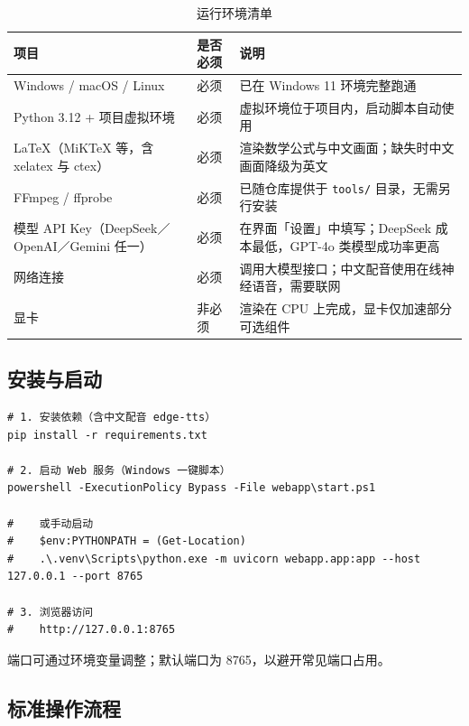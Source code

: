 \documentclass[11pt,a4paper]{ctexart}
\begin{document}
\begin{table}[htbp]
\centering
\small
\caption{运行环境清单}
\begin{tabularx}{\textwidth}{@{}p{3.4cm} p{2.6cm} X@{}}
\toprule
\textbf{项目} & \textbf{是否必须} & \textbf{说明} \\
\midrule
Windows / macOS / Linux & 必须 & 已在 Windows 11 环境完整跑通 \\
Python 3.12 + 项目虚拟环境 & 必须 & 虚拟环境位于项目内，启动脚本自动使用 \\
LaTeX（MiKTeX 等，含 xelatex 与 ctex） & 必须 & 渲染数学公式与中文画面；缺失时中文画面降级为英文 \\
FFmpeg / ffprobe & 必须 & 已随仓库提供于 \texttt{tools/} 目录，无需另行安装 \\
模型 API Key（DeepSeek／OpenAI／Gemini 任一） & 必须 & 在界面「设置」中填写；DeepSeek 成本最低，GPT-4o 类模型成功率更高 \\
网络连接 & 必须 & 调用大模型接口；中文配音使用在线神经语音，需要联网 \\
显卡 & 非必须 & 渲染在 CPU 上完成，显卡仅加速部分可选组件 \\
\bottomrule
\end{tabularx}
\end{table}

\subsection{安装与启动}

\begin{lstlisting}
# 1. 安装依赖（含中文配音 edge-tts）
pip install -r requirements.txt

# 2. 启动 Web 服务（Windows 一键脚本）
powershell -ExecutionPolicy Bypass -File webapp\start.ps1

#    或手动启动
#    $env:PYTHONPATH = (Get-Location)
#    .\.venv\Scripts\python.exe -m uvicorn webapp.app:app --host 127.0.0.1 --port 8765

# 3. 浏览器访问
#    http://127.0.0.1:8765
\end{lstlisting}

端口可通过环境变量调整；默认端口为 8765，以避开常见端口占用。

\subsection{标准操作流程}
\end{document}
